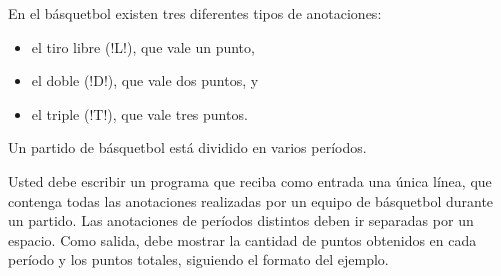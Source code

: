 En el básquetbol existen tres diferentes tipos de anotaciones:
\begin{itemize}
  \item el tiro libre (\li!L!), que vale un punto,
  \item el doble (\li!D!), que vale dos puntos, y
  \item el triple (\li!T!), que vale tres puntos.
\end{itemize}
Un partido de básquetbol está dividido
en varios períodos.

Usted debe escribir un programa que reciba como entrada una única línea,
que contenga todas las anotaciones realizadas
por un equipo de básquetbol durante un partido.
Las anotaciones de períodos distintos deben ir separadas por un espacio.
Como salida,
debe mostrar la cantidad de puntos obtenidos en cada período y los puntos totales,
siguiendo el formato del ejemplo.

\begin{minipage}[t]{24em}
  
\end{minipage}

